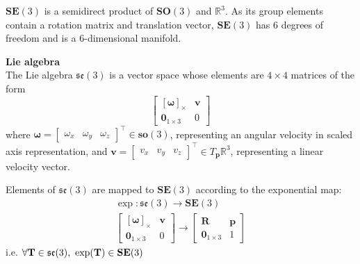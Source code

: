 		$\textbf{SE}(3)$ is a semidirect product of $\textbf{SO}(3)$ and $ \mathbb{R}^3$. As its group elements contain a rotation matrix and translation vector, $\textbf{SE}(3)$ has 6 degrees of freedom and is a 6-dimensional manifold.
			
		\textbf{Lie algebra}\\
		The Lie algebra $\mathfrak{se}(3)$ is a vector space whose elements are $4 \times 4$ matrices of the form
		\begin{equation}
			\begin{bmatrix}
				  [\mathbf{\omega}]_\times	&  \mathbf{v}\\
				  \textbf{0}_{1 \times 3} & 0						  
			\end{bmatrix}
		\end{equation}
		where $\mathbf{\omega} =
		\begin{bmatrix}
			\omega_x & \omega_y & \omega_z				
		\end{bmatrix}
		^\top \in \mathbf{so}(3)$, representing an angular velocity in scaled axis representation, and
		$\mathbf{v} = 
		\begin{bmatrix}
			v_x & v_y & v_z				
		\end{bmatrix}
		^\top \in T_{\mathbf{p}}\mathbb{R}^3$, representing a linear velocity vector.
		
		Elements of $\mathfrak{se}(3)$ are mapped to $\textbf{SE}(3)$ according to the exponential map:
			\begin{equation}
				\begin{split}
					\exp: \mathfrak{se}(3) \rightarrow \mathbf{SE}(3)\\
					\begin{bmatrix}
						  [\mathbf{\omega}]_\times	&  \mathbf{v}\\
						  \textbf{0}_{1 \times 3} & 0						  
					\end{bmatrix}
					\rightarrow 
					\begin{bmatrix}
						  \mathbf{R}	&	\mathbf{p} \\
						  \textbf{0}_{1 \times 3}		& 	1 
					\end{bmatrix}
				\end{split}		
			\end{equation}		
			i.e. $\forall \mathbf{T} \in \mathfrak{se}(3) \textnormal{, } \exp(\mathbf{T}) \in  \mathbf{SE}(3)$
			
